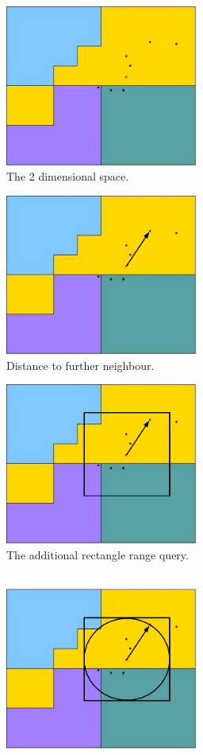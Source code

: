 \documentclass[11pt,a4paper]{globis-book}
\begin{document}
\begin{figure}
    \centering
    \begin{subfigure}[b]{0.4\linewidth}
        \includegraphics[width = 2.5in]{images/zordering-knn-a}
        \caption{The 2 dimensional space.}
    \end{subfigure}%
    \qquad
    \begin{subfigure}[b]{0.4\linewidth}
        \includegraphics[width = 2.5in]{images/zordering-knn-b}
        \caption{Distance to further neighbour.}
    \end{subfigure}
    \begin{subfigure}[b]{0.4\linewidth}
        \includegraphics[width = 2.5in]{images/zordering-knn-c}
        \caption{The additional rectangle range query.}
    \end{subfigure}%
    \qquad
    \begin{subfigure}[b]{0.4\linewidth}
        \includegraphics[width = 2.5in]{images/zordering-knn-d}

\end{subfigure}
\end{figure}
\end{document}
